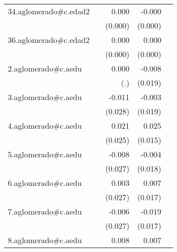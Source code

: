 {\begin{longtable}{l*{4}{D{.}{.}{-1}}}
\addlinespace
34.aglomerado#c.edad2&                     &       0.000\sym{*}  &      -0.000         &                     \\
            &                     &     (0.000)         &     (0.000)         &                     \\
\addlinespace
36.aglomerado#c.edad2&                     &       0.000\sym{***}&       0.000         &                     \\
            &                     &     (0.000)         &     (0.000)         &                     \\
\addlinespace
2.aglomerado#c.aedu&                     &       0.000         &      -0.008         &                     \\
            &                     &         (.)         &     (0.019)         &                     \\
\addlinespace
3.aglomerado#c.aedu&                     &      -0.011         &      -0.003         &                     \\
            &                     &     (0.028)         &     (0.019)         &                     \\
\addlinespace
4.aglomerado#c.aedu&                     &       0.021         &       0.025         &                     \\
            &                     &     (0.025)         &     (0.015)         &                     \\
\addlinespace
5.aglomerado#c.aedu&                     &      -0.008         &      -0.004         &                     \\
            &                     &     (0.027)         &     (0.018)         &                     \\
\addlinespace
6.aglomerado#c.aedu&                     &       0.003         &       0.007         &                     \\
            &                     &     (0.027)         &     (0.017)         &                     \\
\addlinespace
7.aglomerado#c.aedu&                     &      -0.006         &      -0.019         &                     \\
            &                     &     (0.027)         &     (0.017)         &                     \\
\addlinespace
8.aglomerado#c.aedu&                     &       0.008         &       0.007         &                     \\

\end{longtable}}

